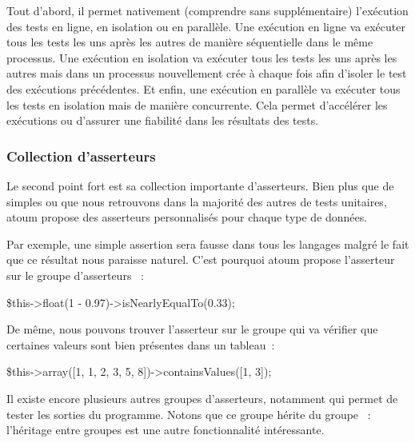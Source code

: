 Tout d'abord, il permet nativement (comprendre sans 
supplémentaire) l'exécution des tests en ligne, en isolation ou en parallèle.
Une exécution en ligne va exécuter tous les tests les uns après les autres de
manière séquentielle dans le même processus. Une exécution en isolation va
exécuter tous les tests les uns après les autres mais dans un processus
nouvellement crée à chaque fois afin d'isoler le test des exécutions
précédentes. Et enfin, une exécution en parallèle va exécuter tous les tests en
isolation mais de manière concurrente. Cela permet d'accélérer les exécutions ou
d'assurer une fiabilité dans les résultats des tests.

\subsubsection{Collection d'asserteurs}

Le second point fort est sa collection importante d'asserteurs. Bien plus que de
simples  ou  que nous retrouvons dans la
majorité des autres  de tests unitaires, atoum propose des
asserteurs personnalisés pour chaque type de données.

\begin{example}

Par exemple, une simple assertion  sera fausse dans tous
les langages malgré le fait que ce résultat nous paraisse naturel. C'est
pourquoi atoum propose l'asserteur  sur le groupe
d'asserteurs ~:
%
\begin{pre}
\$this->float(1 - 0.97)->isNearlyEqualTo(0.33);
\end{pre}

De même, nous pouvons trouver l'asserteur  sur le groupe
 qui va vérifier que certaines valeurs sont bien présentes dans un
tableau~:
%
\begin{pre}
\$this->array([1, 1, 2, 3, 5, 8])->containsValues([1, 3]);
\end{pre}

Il existe encore plusieurs autres groupes d'asserteurs, notamment 
qui permet de tester les sorties du programme. Notons que ce groupe hérite du
groupe ~: l'héritage entre groupes est une autre fonctionnalité
intéressante.

\end{example}

